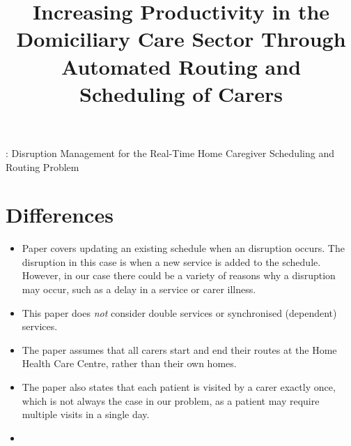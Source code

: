 \documentclass[a4paper]{article}
\begin{document}
\title{Increasing Productivity in the Domiciliary Care Sector Through Automated Routing and Scheduling of Carers}
\date{}
\maketitle

\noindent \citet{yuan2017}: Disruption Management for the Real-Time Home Caregiver Scheduling and Routing Problem

\section{Differences}
\begin{itemize}[leftmargin=*, itemsep=-0.1em]
	\item Paper covers updating an existing schedule when an disruption occurs. The disruption in this case is when a new service is added to the schedule. However, in our case there could be a variety of reasons why a disruption may occur, such as a delay in a service or carer illness.
	\item This paper does \emph{not} consider double services or synchronised (dependent) services.
	\item The paper assumes that all carers start and end their routes at the Home Health Care Centre, rather than their own homes.
	\item The paper also states that each patient is visited by a carer exactly once, which is not always the case in our problem, as a patient may require multiple visits in a single day.
	\item 	
\end{itemize}





\end{document}
